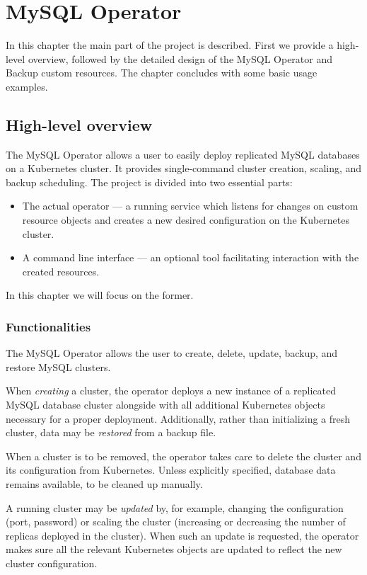 \chapter{MySQL Operator}

In this chapter the main part of the project is described. First we provide
a high-level overview, followed by the detailed design of the MySQL Operator
and Backup custom resources. The chapter concludes with some basic usage examples.

\section{High-level overview}
The MySQL Operator allows a user to easily deploy replicated MySQL databases on a Kubernetes cluster.
It provides single-command cluster creation, scaling, and backup scheduling. The project is divided
into two essential parts:
\begin{itemize}
	\item The actual operator --- a running service which listens for changes on custom resource
	objects and creates a new desired configuration on the Kubernetes cluster.
	\item A command line interface --- an optional tool facilitating interaction with the created
	resources.
\end{itemize}

In this chapter we will focus on the former.

\subsection{Functionalities}
The MySQL Operator allows the user to create, delete, update, backup, and restore MySQL clusters.

When \textit{creating} a cluster, the operator deploys a new instance of a replicated MySQL
database cluster alongside with all additional Kubernetes objects necessary for a proper deployment.
Additionally, rather than initializing a fresh cluster, data may be \textit{restored} from a backup file.

When a cluster is to be removed, the operator takes care to delete the cluster and its
configuration from Kubernetes. Unless explicitly specified, database data remains available, to be
cleaned up manually.

A running cluster may be \textit{updated} by, for example, changing the configuration (port,
password) or scaling the cluster (increasing or decreasing the number of replicas deployed in the
cluster). When such an update is requested, the operator makes sure all the relevant Kubernetes
objects are updated to reflect the new cluster configuration.

